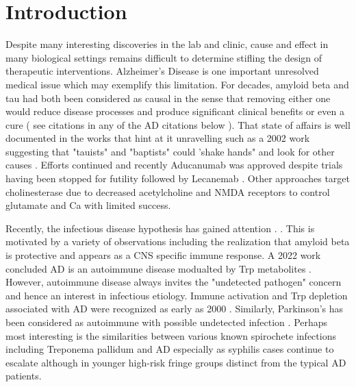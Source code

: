 \documentclass[aps,secnumarabic,balancelastpage,amsmath,amssymb,nofootinbib]{revtex4}
\begin{document}
\maketitle
\tableofcontents
\newpage

\section{Introduction  }

Despite many interesting discoveries in the lab and clinic,
cause and effect in many biological settings remains difficult
to determine  stifling the design of therapeutic interventions.
Alzheimer's Disease is one important unresolved medical issue
which may exemplify this limitation. For decades, amyloid beta and tau
had both been considered as causal in the sense that removing
either one would reduce disease processes and produce
significant clinical benefits or even a cure
( see citations in any of the AD citations below ).  
That state of affairs is well documented 
in the works
that hint at it unravelling\cite{PMID37833948}  such as a 2002 work 
suggesting that  "tauists" and "baptists" could 'shake hands"
and look for other causes \cite{PMID11801334}. Efforts
continued and recently
Aducanumab was approved despite trials having been stopped for futility
\cite{PMC8491638}
followed by Lecanemab \cite{PMC10119064}
\cite{vanDyck_Swanson_Aisen_Lecanemab_Early_Alzheimer_2023}. 
Other approaches   target  cholinesterase  
 \cite{PMC4052996} 
due to decreased acetylcholine and NMDA receptors 
\cite{PMC6375899} to control  glutamate and Ca 
with limited success.

Recently, the infectious disease hypothesis has gained  
attention \cite{10.1371/journal.ppat.1010929}.
\cite{10.3389/fcimb.2023.1123228}
\cite{Lathe_Schultek_Balin_Establishment_consensus_2023}.
This is motivated by a variety of observations
including  the realization that amyloid
beta is protective and appears as a CNS specific immune response.
A 2022 work concluded AD is an autoimmune disease modualted 
by Trp metabolites  
\cite{DiezCecilia_Kolaj_Santos_Alzheimer_disease_2022}.
However, autoimmune disease always invites the "undetected
pathogen" concern and hence an interest in infectious etiology.
Immune activation and Trp depletion associated with AD were recognized
as early as 2000 \cite{Widner2000}.
Similarly, Parkinson's has been considered as autoimmune with 
possible undetected infection \cite{PMID37741513}.
Perhaps most interesting is the similarities between
various known spirochete infections including Treponema pallidum  and AD
\cite{PMC4399390} especially as  syphilis cases
continue to escalate although in younger high-risk fringe
groups
\cite{Amerson_CastilloValladares_Leslie_Resurgence_Syphilis_2022}
distinct from the typical AD patients.  
\end{document}
